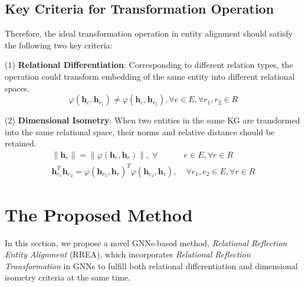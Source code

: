 \documentclass[sigconf,camera-ready]{acmart}
\begin{document}
\subsection{Key Criteria for Transformation Operation}
Therefore, the ideal transformation operation in entity alignment should satisfy the following two key criteria:

(1) \textbf{Relational Differentiation}:
Corresponding to different relation types, the operation could transform embedding of the same entity into different relational spaces.
\begin{equation}
    \varphi(\bm{h}_e,\bm{h}_{r_1}) \neq \varphi(\bm{h}_e,\bm{h}_{r_2}), \forall e\in E, \forall r_1,r_2\in R
\end{equation}

(2) \textbf{Dimensional Isometry}:
When two entities in the same KG are transformed into the same relational space, their norms and relative distance should be retained.
\begin{align}
    \|\bm{h}_e\| = \|\varphi(\bm{h}_e,\bm{h}_r)\| ,\; \forall &e\in E, \forall r\in R\\
    \bm{h}_{e_1}^T\bm{h}_{e_2} = \varphi(\bm{h}_{e_1},\bm{h}_r)^T\varphi(\bm{h}_{e_2},\bm{h}_r),&\; \forall e_1,e_2\in E, \forall r\in R
\end{align}

\section{The Proposed Method}
\label{sec:model}
In this section, we propose a novel GNNs-based method, \emph{Relational Reflection Entity Alignment} (RREA), which incorporates \emph{Relational Reflection Transformation} in GNNs to fulfill both relational differentiation and dimensional isometry criteria at the same time.
\end{document}
